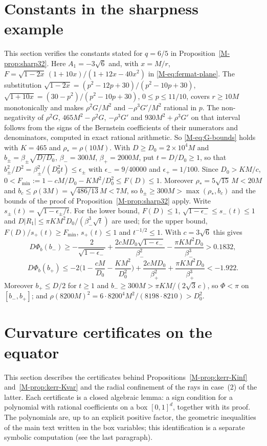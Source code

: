 \documentclass[aip,jmp,amsmath,amssymb,reprint]{revtex4-2}
\theoremstyle{plain}
\theoremstyle{definition}
\begin{document}
\section{Constants in the sharpness example}
\label{sec:supp-sharp32}
This section verifies the constants stated for $q=6/5$ in Proposition~\ref{M-prop:sharp32}. Here
$A_1=-3\sqrt6$ and, with $x=M/r$, $F=\sqrt{1-2x}\,(1+10x)/(1+12x-40x^2)$ in \eqref{M-eq:fermat-plane}. The
substitution $\sqrt{1-2x}=(p^2-12p+30)/(p^2-10p+30)$, $\sqrt{1+10x}=(30-p^2)/(p^2-10p+30)$, $0\le p\le11/10$, covers
$r\ge10M$ monotonically and makes $\rho^2G/M^2$ and $-\rho^3G'/M^2$ rational in $p$. The non-negativity of
$\rho^2G$, $465M^2-\rho^2G$, $-\rho^3G'$ and $930M^2+\rho^3G'$ on that interval follows from the signs of the
Bernstein coefficients of their numerators and denominators, computed in exact rational arithmetic. So
\eqref{M-eq:G-bounds} holds with $K=465$ and $\rho_*=\rho(10M)$. With $D\ge D_0=2\times10^4M$ and
$b_\pm=\beta_\pm\sqrt{D/D_0}$, $\beta_-=300M$, $\beta_+=2000M$, put $t=D/D_0\ge1$, so that
$b_\pm^2/D^2=\beta_\pm^2/(D_0^2t)\le\epsilon_\pm$ with $\epsilon_-=9/40000$ and $\epsilon_+=1/100$. Since $D_0>KM/c$,
$0<F_{\min}:=1-cM/D_0-KM^2/D_0^2\le F(D)\le1$. Moreover $\rho_*=5\sqrt{15}\,M<20M$ and
$b_c\le\rho(3M)=\sqrt{486/13}\,M<7M$, so $b_\pm\ge300M>\max(\rho_*,b_c)$ and the bounds of the proof of
Proposition~\ref{M-prop:sharp32} apply. Write $s_\pm(t)=\sqrt{1-\epsilon_\pm/t}$. For the lower bound,
$F(D)\le1$, $\sqrt{1-\epsilon_-}\le s_-(t)\le1$ and $D|R_1|\le\pi KM^2D_0/(\beta_-^3\sqrt t)$ are used; for the upper
bound, $F(D)/s_+(t)\ge F_{\min}$, $s_+(t)\le1$ and $t^{-1/2}\le1$. With $c=3\sqrt6$ this gives
\[
  D\Phi_b(b_-)\ge-\frac2{\sqrt{1-\epsilon_-}}+\frac{2cMD_0\sqrt{1-\epsilon_-}}{\beta_-^2}-\frac{\pi KM^2D_0}{\beta_-^3}>0.1832,
\]
\[
  D\Phi_b(b_+)\le-2\Big(1-\frac{cM}{D_0}-\frac{KM^2}{D_0^2}\Big)+\frac{2cMD_0}{\beta_+^2}+\frac{\pi KM^2D_0}{\beta_+^3}<-1.922 .
\]
Moreover $b_+\le D/2$ for $t\ge1$ and $b_-\ge300M>\pi KM/(2\sqrt3\,c)$, so $\Phi<\pi$ on $[b_-,b_+]$; and
$\rho(8200M)^2=6\cdot8200^4M^2/(8198\cdot8210)>D_0^2$.

\section{Curvature certificates on the equator}
\label{sec:supp-kerr-cert}
This section describes the certificates behind Propositions~\ref{M-prop:kerr-Kinf} and~\ref{M-prop:kerr-Kvar}
and the radial confinement of the rays in case~(2) of the latter. Each certificate is a closed algebraic
lemma: a sign condition for a polynomial with rational coefficients on a box $[0,1]^d$, together with its
proof. The polynomials are, up to an explicit positive factor, the geometric inequalities of the main text
written in the box variables; this identification is a separate symbolic computation (see the last
paragraph).
\end{document}
